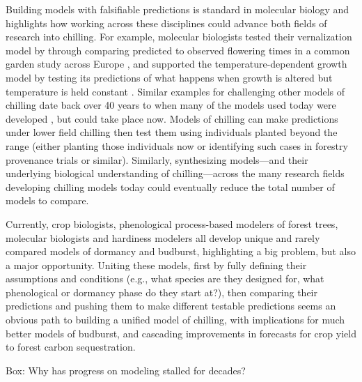 \documentclass[11pt]{article}
\begin{document}
Building models with falsifiable predictions is standard in molecular biology and highlights how working across these disciplines could advance both fields of research into chilling. For example, molecular biologists tested their vernalization model by through comparing predicted to observed flowering times in a common garden study across Europe \citep[][]{Wilczek:2009oa}, and supported the temperature-dependent growth model by testing its predictions of what happens when growth is altered but temperature is held constant \citep{zhao2020temperature}. Similar examples for challenging other models of chilling date back over 40 years to when many of the models used today were developed \citep{richardson1974,chuine2016,ospreebbms}, but could take place now. Models of chilling can make predictions under lower field chilling then test them using individuals planted beyond the range (either planting those individuals now or identifying such cases in forestry provenance trials or similar). Similarly, synthesizing models---and their underlying biological understanding of chilling---across the many research fields developing chilling models today could eventually reduce the total number of models to compare. 

Currently, crop biologists, phenological process-based modelers of forest trees, molecular biologists and hardiness modelers all develop unique and rarely compared models of dormancy and budburst, highlighting a big problem, but also a major opportunity. Uniting these models, first by fully defining their assumptions and conditions (e.g., what species are they designed for, what phenological or dormancy phase do they start at?), then comparing their predictions and pushing them to make different testable predictions seems an obvious path to building a unified model of chilling, with implications for much better models of budburst, and cascading improvements in forecasts for crop yield to forest carbon sequestration. 


\vspace{10ex}
{\sc Box: Why has progress on modeling stalled for decades?} %
\end{document}
